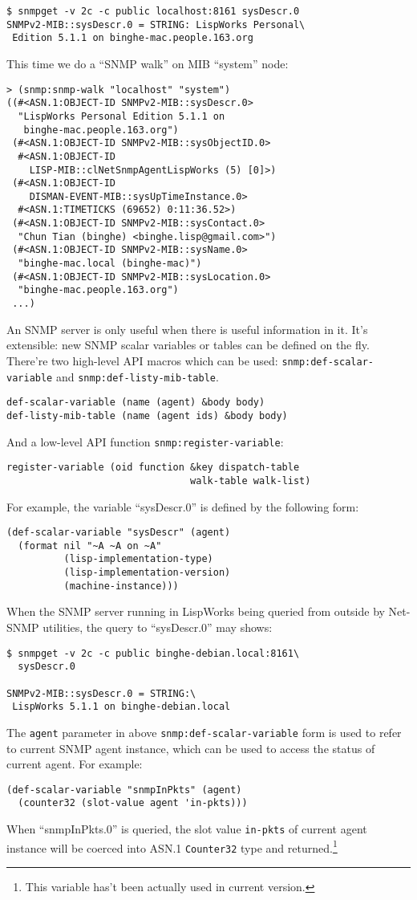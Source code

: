\documentclass[reprint,natbib,9pt]{sigplanconf}
\begin{document}
\begin{verbatim}
$ snmpget -v 2c -c public localhost:8161 sysDescr.0
SNMPv2-MIB::sysDescr.0 = STRING: LispWorks Personal\
 Edition 5.1.1 on binghe-mac.people.163.org
\end{verbatim}

This time we do a ``SNMP walk'' on MIB ``system'' node:
\begin{verbatim}
> (snmp:snmp-walk "localhost" "system")
((#<ASN.1:OBJECT-ID SNMPv2-MIB::sysDescr.0>
  "LispWorks Personal Edition 5.1.1 on
   binghe-mac.people.163.org")
 (#<ASN.1:OBJECT-ID SNMPv2-MIB::sysObjectID.0>
  #<ASN.1:OBJECT-ID
    LISP-MIB::clNetSnmpAgentLispWorks (5) [0]>)
 (#<ASN.1:OBJECT-ID
    DISMAN-EVENT-MIB::sysUpTimeInstance.0>
  #<ASN.1:TIMETICKS (69652) 0:11:36.52>)
 (#<ASN.1:OBJECT-ID SNMPv2-MIB::sysContact.0>
  "Chun Tian (binghe) <binghe.lisp@gmail.com>")
 (#<ASN.1:OBJECT-ID SNMPv2-MIB::sysName.0>
  "binghe-mac.local (binghe-mac)")
 (#<ASN.1:OBJECT-ID SNMPv2-MIB::sysLocation.0>
  "binghe-mac.people.163.org")
 ...)
\end{verbatim}

An SNMP server is only useful when there is useful information in it.
It's extensible: new SNMP scalar variables or tables can be defined on the
fly. There're two high-level API macros which can be used:
\texttt{snmp:def-scalar-variable} and \texttt{snmp:def-listy-mib-table}.
\begin{verbatim}
def-scalar-variable (name (agent) &body body)
def-listy-mib-table (name (agent ids) &body body)
\end{verbatim}
And a low-level API function \texttt{snmp:register-variable}:
\begin{verbatim}
register-variable (oid function &key dispatch-table
                                walk-table walk-list)
\end{verbatim}
For example, the variable ``sysDescr.0'' is defined by the following
form:
\begin{verbatim}
(def-scalar-variable "sysDescr" (agent)
  (format nil "~A ~A on ~A"
          (lisp-implementation-type)
          (lisp-implementation-version)
          (machine-instance)))
\end{verbatim}
When the SNMP server running in LispWorks being queried from outside
by Net-SNMP utilities, the query to ``sysDescr.0'' may shows:
\begin{verbatim}
$ snmpget -v 2c -c public binghe-debian.local:8161\
  sysDescr.0

SNMPv2-MIB::sysDescr.0 = STRING:\
 LispWorks 5.1.1 on binghe-debian.local
\end{verbatim}
The \texttt{agent} parameter in above
\texttt{snmp:def-scalar-variable} form is used to refer to current
SNMP agent instance, which can be used to access the status of current
agent. For example:
\begin{verbatim}
(def-scalar-variable "snmpInPkts" (agent)
  (counter32 (slot-value agent 'in-pkts)))
\end{verbatim}
When ``snmpInPkts.0'' is queried, the slot value \texttt{in-pkts} of current
agent instance will be coerced into ASN.1 \texttt{Counter32} type and
returned.\footnote{This variable has't been actually used in current version.}
\end{document}
